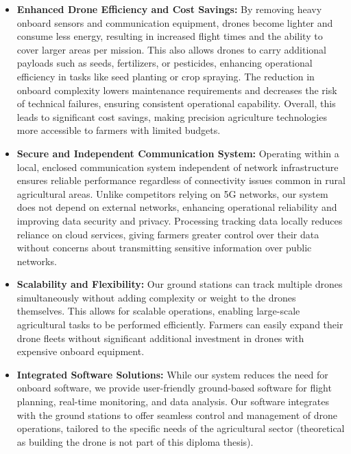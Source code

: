 \begin{itemize} 
	\item \textbf{Enhanced Drone Efficiency and Cost Savings:} By removing heavy onboard sensors and communication equipment, drones become lighter and consume less energy, resulting in increased flight times and the ability to cover larger areas per mission. This also allows drones to carry additional payloads such as seeds, fertilizers, or pesticides, enhancing operational efficiency in tasks like seed planting or crop spraying. The reduction in onboard complexity lowers maintenance requirements and decreases the risk of technical failures, ensuring consistent operational capability. Overall, this leads to significant cost savings, making precision agriculture technologies more accessible to farmers with limited budgets.
	
	\item \textbf{Secure and Independent Communication System:} Operating within a local, enclosed communication system independent of network infrastructure ensures reliable performance regardless of connectivity issues common in rural agricultural areas. Unlike competitors relying on 5G networks, our system does not depend on external networks, enhancing operational reliability and improving data security and privacy. Processing tracking data locally reduces reliance on cloud services, giving farmers greater control over their data without concerns about transmitting sensitive information over public networks.
	
	\item \textbf{Scalability and Flexibility:} Our ground stations can track multiple drones simultaneously without adding complexity or weight to the drones themselves. This allows for scalable operations, enabling large-scale agricultural tasks to be performed efficiently. Farmers can easily expand their drone fleets without significant additional investment in drones with expensive onboard equipment.
	
	\item \textbf{Integrated Software Solutions:} While our system reduces the need for onboard software, we provide user-friendly ground-based software for flight planning, real-time monitoring, and data analysis. Our software integrates with the ground stations to offer seamless control and management of drone operations, tailored to the specific needs of the agricultural sector (theoretical as building the drone is not part of this diploma thesis).
\end{itemize}

